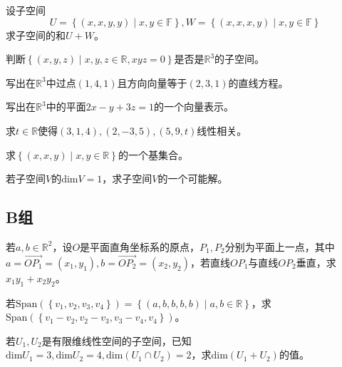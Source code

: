 \begin{reidai}
	设子空间$$U=\left\{ (x,x,y,y)\mid x,y\in \mathbb{F} \right\},W=\left\{ (x,x,x,y)\mid x,y\in \mathbb{F} \right\}$$求子空间的和$U+W$。
\end{reidai}

\begin{reidai}
	判断$\left\{ (x,y,z) \mid x,y,z\in \mathbb{R},xyz=0 \right\}$是否是$\mathbb{R}^3$的子空间。
\end{reidai}

\begin{reidai}
	写出在$\mathbb{R}^3$中过点$(1,4,1)$且方向向量等于$(2,3,1)$的直线方程。
\end{reidai}

\begin{reidai}
	写出在$\mathbb{R}^3$中的平面$2x-y+3z=1$的一个向量表示。
\end{reidai}

\begin{reidai}
	求$t\in \mathbb{R}$使得${(3,1,4),(2,-3,5),(5,9,t)}$线性相关。
\end{reidai}

\begin{reidai}
	求$\left\{ (x,x,y)\mid x,y \in \mathbb{R} \right\}$的一个基集合。
\end{reidai}

\begin{reidai}
	若子空间$V$的$\text{dim} V=1$，求子空间$V$的一个可能解。
\end{reidai}

\subsection{B组}

\begin{reidai}
	若$a,b\in \mathbb{R}^2$，设$O$是平面直角坐标系的原点，$P_1,P_2$分别为平面上一点，其中$a=\overrightarrow{OP_1}=(x_1,y_1),b=\overrightarrow{OP_2}=(x_2,y_2)$，若直线$OP_1$与直线$OP_2$垂直，求$x_1y_1+x_2y_2$。
\end{reidai}

\begin{reidai}
	若$\text{Span}(\left\{ v_1,v_2,v_3,v_4 \right\})=\left\{ (a,b,b,b,b)\mid a,b \in \mathbb{R} \right\}$，求$\text{Span}(\left\{ v_1-v_2,v_2-v_3,v_3-v_4,v_4 \right\})$。
\end{reidai}

\begin{reidai}
	若$U_1,U_2$是有限维线性空间的子空间，已知$\text{dim}U_1=3,\text{dim}U_2=4,\text{dim}(U_1 \cap U_2)=2$，求$\text{dim}(U_1+U_2)$的值。
\end{reidai}

